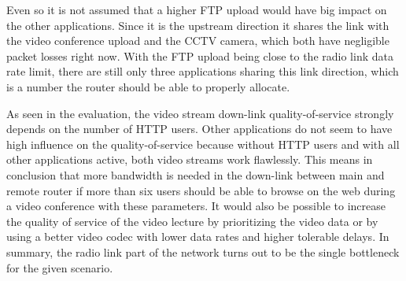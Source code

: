 \documentclass[a4paper,10pt]{book}\usepackage{graphicx}
\begin{document}
Even so it is not assumed that a higher FTP upload would have big impact on the other applications. Since it is the upstream direction it shares the link with the video conference upload and the CCTV camera, which both have negligible packet losses right now. With the FTP upload being close to the radio link data rate limit, there are still only three applications sharing this link direction, which is a number the router should be able to properly allocate.

As seen in the evaluation, the video stream down-link quality-of-service strongly depends on the number of HTTP users. Other applications do not seem to have high influence on the quality-of-service because without HTTP users and with all other applications active, both video streams work flawlessly. This means in conclusion that more bandwidth is needed in the down-link between main and remote router if more than six users should be able to browse on the web during a video conference with these parameters. It would also be possible to increase the quality of service of the video lecture by prioritizing the video data or by using a better video codec with lower data rates and higher tolerable delays. In summary, the radio link part of the network turns out to be the single bottleneck for the given scenario. 

	
	
\end{document}
